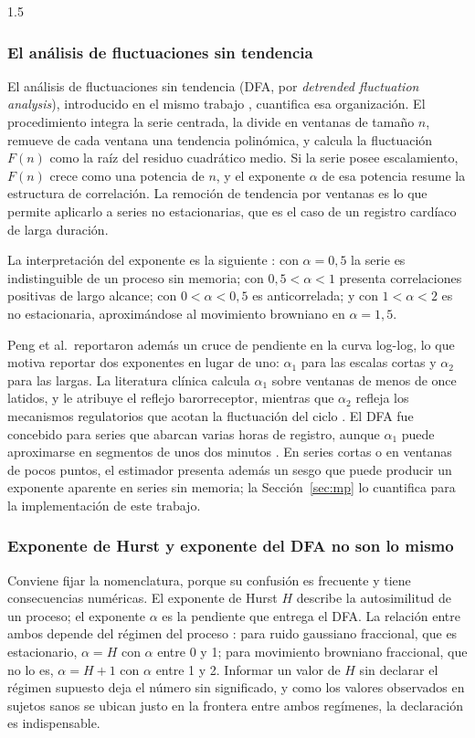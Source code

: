 \begin{spacing}{1.5}
\subsubsection{El análisis de fluctuaciones sin tendencia}

El análisis de fluctuaciones sin tendencia (DFA, por \emph{detrended
fluctuation analysis}), introducido en el mismo trabajo
\cite{peng1995quantification}, cuantifica esa organización. El procedimiento
integra la serie centrada, la divide en ventanas de tamaño $n$, remueve de cada
ventana una tendencia polinómica, y calcula la fluctuación $F(n)$ como la raíz
del residuo cuadrático medio. Si la serie posee escalamiento, $F(n)$ crece como
una potencia de $n$, y el exponente $\alpha$ de esa potencia resume la
estructura de correlación. La remoción de tendencia por ventanas es lo que
permite aplicarlo a series no estacionarias, que es el caso de un registro
cardíaco de larga duración.

La interpretación del exponente es la siguiente \cite{hardstone2012dfa}: con
$\alpha = 0{,}5$ la serie es indistinguible de un proceso sin memoria; con
$0{,}5 < \alpha < 1$ presenta correlaciones positivas de largo alcance; con
$0 < \alpha < 0{,}5$ es anticorrelada; y con $1 < \alpha < 2$ es no
estacionaria, aproximándose al movimiento browniano en $\alpha = 1{,}5$.

Peng et al.\ reportaron además un cruce de pendiente en la curva log-log, lo
que motiva reportar dos exponentes en lugar de uno: $\alpha_1$ para las escalas
cortas y $\alpha_2$ para las largas. La literatura clínica calcula $\alpha_1$
sobre ventanas de menos de once latidos, y le atribuye el reflejo
barorreceptor, mientras que $\alpha_2$ refleja los mecanismos regulatorios que
acotan la fluctuación del ciclo \cite{shaffer2017overview}. El DFA fue
concebido para series que abarcan varias horas de registro, aunque $\alpha_1$
puede aproximarse en segmentos de unos dos minutos \cite{shaffer2017overview}.
En series cortas o en ventanas de pocos puntos, el estimador presenta además un
sesgo que puede producir un exponente aparente en series sin memoria; la
Sección~\ref{sec:mp} lo cuantifica para la implementación de este trabajo.

\subsubsection{Exponente de Hurst y exponente del DFA no son lo mismo}

Conviene fijar la nomenclatura, porque su confusión es frecuente y tiene
consecuencias numéricas. El exponente de Hurst $H$ describe la autosimilitud de
un proceso; el exponente $\alpha$ es la pendiente que entrega el DFA. La
relación entre ambos depende del régimen del proceso
\cite{hardstone2012dfa}: para ruido gaussiano fraccional, que es estacionario,
$\alpha = H$ con $\alpha$ entre 0 y 1; para movimiento browniano fraccional, que
no lo es, $\alpha = H + 1$ con $\alpha$ entre 1 y 2. Informar un valor de $H$
sin declarar el régimen supuesto deja el número sin significado, y como los
valores observados en sujetos sanos se ubican justo en la frontera entre ambos
regímenes, la declaración es indispensable.


\end{spacing}
